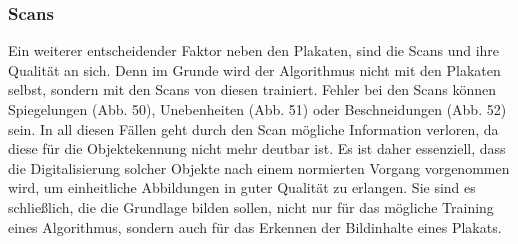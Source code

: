 \documentclass[a4paper,12pt,ngerman]{article}
\begin{document}
\subsubsection{Scans}
Ein weiterer entscheidender Faktor neben den Plakaten, sind die Scans und ihre Qualität an sich. Denn im Grunde wird der Algorithmus nicht mit den Plakaten selbst, sondern mit den Scans von diesen trainiert. Fehler bei den Scans können Spiegelungen (Abb. 50), Unebenheiten (Abb. 51) oder Beschneidungen (Abb. 52) sein. In all diesen Fällen geht durch den Scan mögliche Information verloren, da diese für die Objektekennung nicht mehr deutbar ist. Es ist daher essenziell, dass die Digitalisierung solcher Objekte nach einem normierten Vorgang vorgenommen wird, um einheitliche Abbildungen in guter Qualität zu erlangen. Sie sind es schließlich, die die Grundlage bilden sollen, nicht nur für das mögliche Training eines Algorithmus, sondern auch für das Erkennen der Bildinhalte eines Plakats. \\
\end{document}
